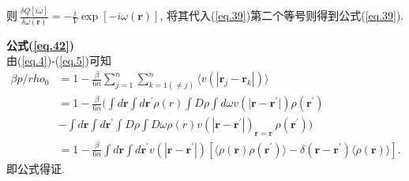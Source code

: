 则$\ \frac{\delta Q[i\omega]}{\delta
\omega(\bm{r})}=-\frac{i}{V}\exp[-i\omega(\bm{r})]$,
将其代入(\ref{eq.39})第二个等号则得到公式(\ref{eq.39}).
\par
\textbf{公式(\ref{eq.42})}
\\
由(\ref{eq.4})-(\ref{eq.5})可知
 \begin{equation}
       \begin{aligned}
           \beta p/rho_{0}&=1-\frac{\beta}{6n}\sum^{n}_{j=1}\sum^{n}_{k=1(\neq
           j)}\langle v(|\bm{r}_{j}-\bm{r}_{k}|)\rangle
           \\
            &=1-\frac{\beta}{6n}(\int d\bm{r}\int d\bm{r^{'}}\rho(r)\int D\rho
            \int d\omega v(|\bm{r}-\bm{r^{'}|})\rho(\bm{r}^{'})
            \\
            &-\int d\bm{r}\int d\bm{r^{'}} \int D\rho \int D\omega
            \rho(r)v(|\bm{r}-\bm{r^{'}}|)_{\bm{r}=\bm{r^{'}}}\rho(\bm{r^{'}}))
           \\
           &=1-\frac{\beta}{6n} \int d\bm{r} \int d\bm{r^{'}}
           v(|\bm{r}-\bm{r^{'}} |) [\langle \rho(\bm{r})\rho(\bm{r^{'}})
           \rangle -\delta(\bm{r}-\bm{r^{'}})\langle\rho(\bm{r})\rangle ].
       \end{aligned}
       \label{A.20}
    \end{equation}
即公式得证.








